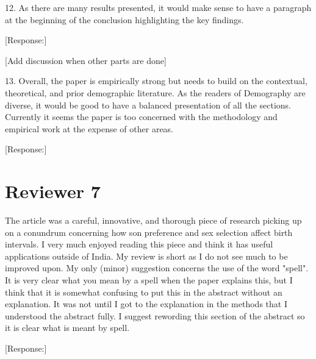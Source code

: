 \documentclass[letterpaper,12pt]{article}
\begin{document}
12. As there are many results presented, it would make sense to have a
paragraph at the beginning of the conclusion highlighting the key
findings.

[Response:]

[Add discussion when other parts are done]

13. Overall, the paper is empirically strong but needs to build on the
contextual, theoretical, and prior demographic literature. As the
readers of Demography are diverse, it would be good to have a balanced
presentation of all the sections. Currently it seems the paper is too
concerned with the methodology and empirical work at the expense of
other areas.

[Response:]

\newpage

\section*{Reviewer 7}

The article was a careful, innovative, and thorough piece of research
picking up on a conundrum concerning how son preference and sex
selection affect birth intervals. I very much enjoyed reading this piece
and think it has useful applications outside of India.  My review is
short as I do not see much to be improved upon.  My only (minor)
suggestion concerns the use of the word "spell".  It is very clear what
you mean by a spell when the paper explains this, but I think that it is
somewhat confusing to put this in the abstract without an explanation. 
It was not until I got to the explanation in the methods that I
understood the abstract fully.  I suggest rewording this section of the
abstract so it is clear what is meant by spell.

[Response:]



\newpage


\end{document}
